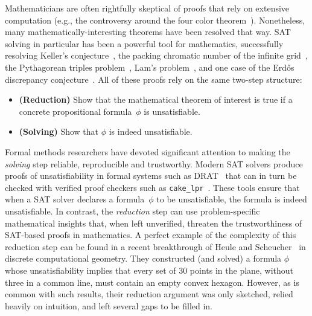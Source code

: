Mathematicians are often rightfully skeptical of proofs that rely on extensive computation (e.g., the controversy around the four color theorem~\cite{Walters2004ItAT}).
Nonetheless, many mathematically-interesting theorems have been resolved that way.
SAT solving in particular has been a powerful tool for mathematics, successfully resolving
Keller's conjecture~\cite{brakensiek2023resolution},
the packing chromatic number of the infinite grid~\cite{Subercaseaux_Heule_2023},
the Pythagorean triples problem~\cite{Heule_2016},
Lam's problem~\cite{21bright_sat_based_resolution_lams_problem},
and one case of the Erd\H{o}s discrepancy conjecture~\cite{konev2014sat}.
All of these proofs rely on the same two-step structure:
\begin{itemize}
\item \textbf{(Reduction)} Show that the mathematical theorem of interest is true if a concrete propositional formula~$\phi$ is unsatisfiable.
\item \textbf{(Solving)} Show that $\phi$ is indeed unsatisfiable.
\end{itemize}


Formal methods researchers have devoted significant attention to making the \emph{solving} step reliable, reproducible and trustworthy.
Modern SAT solvers produce proofs of unsatisfiability in formal systems
such as DRAT~\cite{drat-trim14}
that can in turn be checked with verified proof checkers
such as \texttt{cake\_lpr}~\cite{tanVerifiedPropagationRedundancy2023}.
These tools ensure that when a SAT solver declares a formula~$\phi$ to be unsatisfiable, the formula is indeed unsatisfiable.
In contrast, the \emph{reduction} step can use problem-specific mathematical insights that, when left unverified, threaten the trustworthiness of SAT-based proofs in mathematics.
A perfect example of the complexity of this reduction step can be found in a recent breakthrough of Heule and Scheucher~\cite{emptyHexagonNumber} in discrete computational geometry.
They constructed (and solved) a formula $\phi$ whose unsatisfiability implies that every set of 30 points in the plane, without three in a common line, must contain an empty convex hexagon.
However, as is common with such results, their reduction argument was only sketched, relied heavily on intuition,
and left several gaps to be filled in.


